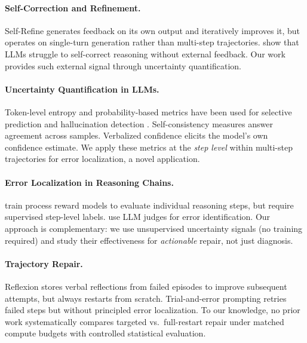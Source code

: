 \documentclass[letterpaper]{article}
\begin{document}
\paragraph{Self-Correction and Refinement.}
Self-Refine \citep{madaan2023selfrefine} generates feedback on its own output and iteratively improves it, but operates on single-turn generation rather than multi-step trajectories. \citet{huang2024large} show that LLMs struggle to self-correct reasoning without external feedback. Our work provides such external signal through uncertainty quantification.

\paragraph{Uncertainty Quantification in LLMs.}
Token-level entropy and probability-based metrics have been used for selective prediction \citep{kadavath2022language} and hallucination detection \citep{manakul2023selfcheckgpt}. Self-consistency \citep{wang2023selfconsistency} measures answer agreement across samples. Verbalized confidence \citep{tian2023just} elicits the model's own confidence estimate. We apply these metrics at the \emph{step level} within multi-step trajectories for error localization, a novel application.

\paragraph{Error Localization in Reasoning Chains.}
\citet{lightman2024lets} train process reward models to evaluate individual reasoning steps, but require supervised step-level labels. \citet{pan2024automatically} use LLM judges for error identification. Our approach is complementary: we use unsupervised uncertainty signals (no training required) and study their effectiveness for \emph{actionable} repair, not just diagnosis.

\paragraph{Trajectory Repair.}
Reflexion \citep{shinn2023reflexion} stores verbal reflections from failed episodes to improve subsequent attempts, but always restarts from scratch. Trial-and-error prompting \citep{qian2023creator} retries failed steps but without principled error localization. To our knowledge, no prior work systematically compares targeted vs.\ full-restart repair under matched compute budgets with controlled statistical evaluation.
\end{document}
